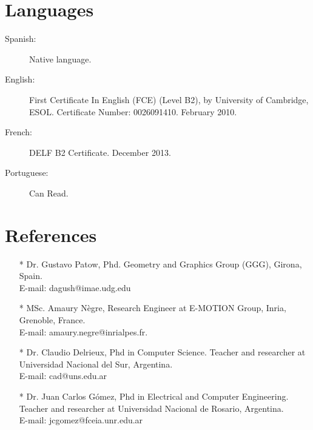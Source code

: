 \documentclass[a4paper,12pt]{article}
\begin{document}
\section*{Languages}

\begin{small}
\begin{description}
	\item[Spanish:] Native language.
	\item[English:] First Certificate In English (FCE) (Level B2), by University of Cambridge, ESOL. Certificate Number: 0026091410. February 2010.
	\item[French:] DELF B2 Certificate. December 2013.
	\item[Portuguese:] Can Read.
\end{description}
\end{small}

\section*{References}

\begin{itemize}
	\item[*] Dr. Gustavo Patow, Phd. Geometry and Graphics Group (GGG), Girona, Spain.\\E-mail: dagush@imae.udg.edu \\
	\item[*] MSc. Amaury Nègre, Research Engineer at E-MOTION Group, Inria, Grenoble, France.\\E-mail: amaury.negre@inrialpes.fr. \\
	\item[*] Dr. Claudio Delrieux, Phd in Computer Science. Teacher and researcher at Universidad Nacional del Sur, Argentina.\\E-mail: cad@uns.edu.ar\\
	\item[*] Dr. Juan Carlos G\'omez, Phd in Electrical and Computer Engineering. Teacher and researcher at Universidad Nacional de Rosario, Argentina.\\E-mail: jcgomez@fceia.unr.edu.ar\\
\end{itemize}
\end{document}
